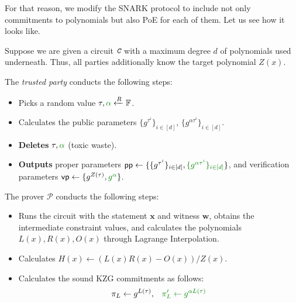 \documentclass[../lecture-notes.tex]{subfiles}
\begin{document}
For that reason, we modify the SNARK protocol to include not only commitments to polynomials but also PoE for each of them. Let us see how it looks like.

\begin{tcolorbox}[title=Attempt \#2: SNARK with PoE included,
    colback=blue!5!white,
    colframe=blue!75!black,
    colbacktitle=blue!25!white,
    coltitle=blue!20!black,
    fonttitle=\bfseries,
    boxrule=1.25pt,
    subtitle style={boxrule=0pt,
    colback=blue!20!white,
    colupper=blue!75!gray} ]

    Suppose we are given a circuit $\textit{\texttt{C}}$ with a maximum degree $d$ of polynomials used underneath. Thus, all parties additionally know the target polynomial $Z(x)$.

    The \emph{trusted party} conducts the following steps:
    \begin{itemize}[label=]
        \item Picks a random value $\tau, \textcolor{green!50!black}{\alpha} \xleftarrow{R} \mathbb{F}$.
        \item Calculates the public parameters $\{g^{\tau^i}\}_{i \in [d]}$, \textcolor{green!50!black}{$\{g^{\alpha\tau^i}\}_{i \in [d]}$}.
        \item \textbf{Deletes} $\tau, \textcolor{green!50!black}{\alpha}$ (toxic waste).
        \item \textbf{Outputs} proper parameters $\mathsf{pp}\gets\{\{g^{\tau^i}\}_{i \in [d]}, \textcolor{green!50!black}{\{g^{\alpha\tau^i}\}_{i \in [d]}}\}$, and verification parameters $\mathsf{vp} \gets \{g^{Z(\tau)}, \textcolor{green!50!black}{g^{\alpha}}\}$.
    \end{itemize}
    The prover $\mathcal{P}$ conducts the following steps:
    \begin{itemize}[label=]
        \item Runs the circuit with the statement $\mathbf{x}$ and witness $\mathbf{w}$, obtains the intermediate constraint values, and calculates the polynomials $L(x), R(x), O(x)$ through Lagrange Interpolation.
        \item Calculates $H(x) \gets (L(x)R(x) - O(x))\big/ Z(x)$.
        \item Calculates the sound KZG commitments as follows: 
        \begin{align*}
            \pi_L \gets g^{L(\tau)}, & \quad\textcolor{green!50!black}{\pi_L' \gets g^{\alpha L(\tau)}} \\

\end{align*}
\end{itemize}
\end{tcolorbox}
\end{document}
